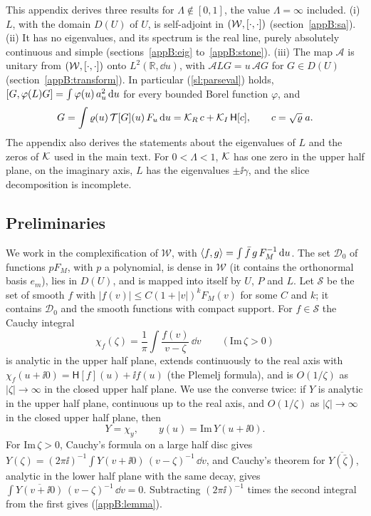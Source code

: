 This appendix derives three results for $\Lambda\notin[0,1]$, the value $\Lambda=\infty$ included. (i) $L$, with the domain $D(U)$ of $U$, is self-adjoint in $(\mathcal W,[\cdot,\cdot])$ (section~\ref{appB:sa}). (ii) It has no eigenvalues, and its spectrum is the real line, purely absolutely continuous and simple (sections~\ref{appB:eig} to~\ref{appB:stone}). (iii) The map $\mathcal A$ is unitary from $(\mathcal W,[\cdot,\cdot])$ onto $L^2(\mathbb R,\dd u)$, with $\mathcal ALG=u\,\mathcal AG$ for $G\in D(U)$ (section~\ref{appB:transform}). In particular (\ref{sl:parseval}) holds, $[G,\varphi(L)G]=\int\varphi(u)\,a_u^2\,\mathrm{d} u$ for every bounded Borel function $\varphi$, and
\begin{equation}\label{sl:inverse}
  G=\int\varrho(u)\,\mathcal T[G](u)\,F_u\,\mathrm{d} u=\mathcal K_R\,c+\mathcal K_I\,\mathsf H[c],\qquad c=\sqrt\varrho\;a .
\end{equation}
The appendix also derives the statements about the eigenvalues of $L$ and the zeros of $\mathcal K$ used in the main text. For $0<\Lambda<1$, $\mathcal K$ has one zero in the upper half plane, on the imaginary axis, $L$ has the eigenvalues $\pm\ii\gamma$, and the slice decomposition is incomplete.

\subsection{Preliminaries}\label{appB:prelim}

We work in the complexification of $\mathcal W$, with $\langle f,g\rangle=\int\bar f\,g\,F_M^{-1}\,\mathrm{d} u$. The set $\mathcal D_0$ of functions $pF_M$, with $p$ a polynomial, is dense in $\mathcal W$ (it contains the orthonormal basis $e_m$), lies in $D(U)$, and is mapped into itself by $U$, $P$ and $L$. Let $\mathcal S$ be the set of smooth $f$ with $|f(v)|\le C(1+|v|)^kF_M(v)$ for some $C$ and $k$; it contains $\mathcal D_0$ and the smooth functions with compact support. For $f\in\mathcal S$ the Cauchy integral
\begin{equation*}
  \chi_f(\zeta)=\frac{1}{\pi}\int\frac{f(v)}{v-\zeta}\,\dd v\qquad(\mathrm{Im}\,\zeta>0)
\end{equation*}
is analytic in the upper half plane, extends continuously to the real axis with $\chi_f(u+\ii0)=\mathsf H[f](u)+\ii f(u)$ (the Plemelj formula), and is $O(1/\zeta)$ as $|\zeta|\to\infty$ in the closed upper half plane. We use the converse twice: if $Y$ is analytic in the upper half plane, continuous up to the real axis, and $O(1/\zeta)$ as $|\zeta|\to\infty$ in the closed upper half plane, then
\begin{equation}\label{appB:lemma}
  Y=\chi_y,\qquad y(u)=\mathrm{Im}\,Y(u+\ii0).
\end{equation}
For $\mathrm{Im}\,\zeta>0$, Cauchy's formula on a large half disc gives $Y(\zeta)=(2\pi\ii)^{-1}\int Y(v+\ii0)\,(v-\zeta)^{-1}\,\dd v$, and Cauchy's theorem for $\overline{Y(\bar\zeta)}$, analytic in the lower half plane with the same decay, gives $\int\overline{Y(v+\ii0)}\,(v-\zeta)^{-1}\,\dd v=0$. Subtracting $(2\pi\ii)^{-1}$ times the second integral from the first gives (\ref{appB:lemma}).

